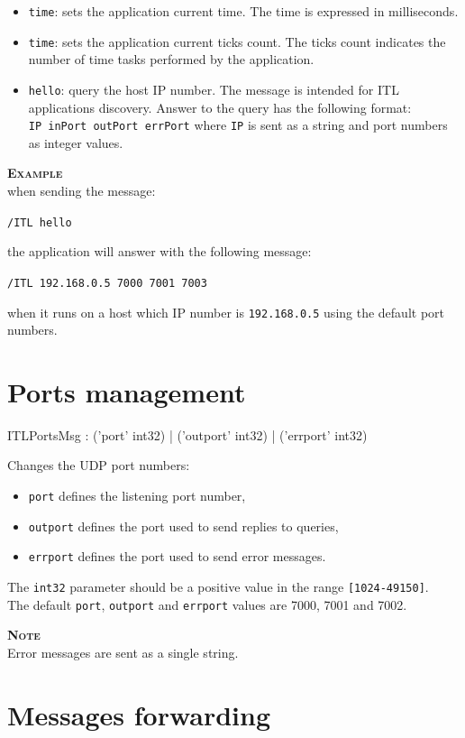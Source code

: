 \documentclass[a4paper,twoside]{report}
\newcommand{\sublevel}[1]	{\section{#1}}
\newcommand{\OSC}[1]		{\texttt{#1}}
\newcommand{\values}[1]	{\texttt{#1}}
\newcommand{\oldexample}		{\hspace*{1cm}}
\newcommand{\example}		{\textbf{\hspace{-1.5cm}\textbf{\textsc{Example }}}}
\newcommand{\note}	[1]		{\vspace{2mm}\textbf{\hspace{-1.03cm}\textbf{\textsc{Note #1}}}}
\newcommand{\sample}	[1]			{\vspace{-2mm}\begin{center}\colorbox{mygrey}{
								\begin{minipage}[t]{0.9\columnwidth} 
								{\small \texttt{#1}}
								\end{minipage}}\end{center}}
\newcommand{\sampleindent}	{ \hspace{0.5cm} }
\begin{document}
\begin{itemize}
\item \OSC{time}: sets the application current time. The time is expressed in milliseconds.

\item \OSC{time}: sets the application current ticks count. The ticks count indicates the number of time tasks performed by the application.

\item \OSC{hello}: query the host IP number. The message is intended for ITL applications discovery. Answer to the query has the following format: \\
\oldexample \OSC{IP  inPort outPort errPort} where \OSC{IP} is sent as a string and port numbers as integer values.

\end{itemize}

\example \\
when sending the message:
\sample{/ITL hello}
\sampleindent the application will answer with the following message:
\sample{/ITL 192.168.0.5  7000 7001 7003}
\sampleindent when it runs on a host which IP number is \OSC{192.168.0.5} using the default port numbers.

\sublevel{Ports management}
\label{ITLPorts}

\begin{rail}
ITLPortsMsg : ('port' int32)
		| ('outport' int32)
		| ('errport' int32)
\end{rail}

Changes the UDP port numbers:
\begin{itemize}
\item \OSC{port} defines the listening port number, 
\item \OSC{outport} defines the port used to send replies to queries, 
\item \OSC{errport} defines the port used to send error messages. 
\end{itemize}
The \OSC{int32} parameter should be a positive value in the range \values{[1024-49150]}. \\
The default \OSC{port}, \OSC{outport} and \OSC{errport} values are 7000, 7001 and 7002.

\note{} \\
Error messages are sent as a single string.

\sublevel{Messages forwarding}
\label{ITLForward}
\end{document}
